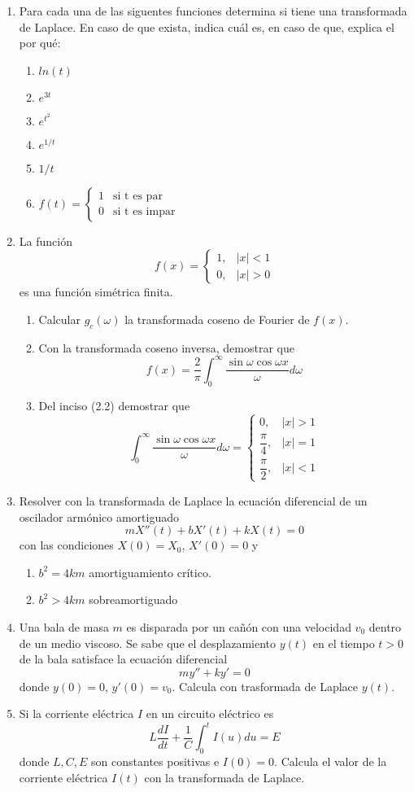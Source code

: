 \begin{enumerate}
\item Para cada una de las siguentes funciones determina si tiene una transformada de Laplace. En caso de que exista, indica cuál es, en caso de que, explica el por qué:
\begin{enumerate}
\item $ln(t)$
\item $e^{3t}$
\item $e^{t^{2}}$
\item $e^{1/t}$
\item $1/t$
\item $f(t) = \begin{cases} 1 & \mbox{si t es par} \\ 0 & \mbox{si t es impar} \end{cases}$
\end{enumerate}
\item La función
\[ f(x) = \begin{cases}
1, & \vert x \vert < 1 \\
0, & \vert x \vert > 0
\end{cases} \]
es una función simétrica finita.
\begin{enumerate}
\item Calcular $g_{c}(\omega)$ la transformada coseno de Fourier de $f(x)$.
\item\label{itm:inciso2} Con la transformada coseno inversa, demostrar que
\[ f(x) = \dfrac{2}{\pi} \int_{0}^{\infty} \dfrac{\sin \omega \cos \omega x}{\omega} d \omega \] 
\item Del inciso (2.2) demostrar que
\[ \int_{0}^{\infty} \dfrac{\sin \omega \cos \omega x}{\omega} d \omega = 
\begin{cases}
0, & \vert x \vert > 1 \\
\dfrac{\pi}{4}, & \vert x \vert = 1 \\
\dfrac{\pi}{2}, & \vert x \vert < 1
\end{cases} \]
\end{enumerate}
\item Resolver con la transformada de Laplace la ecuación diferencial de un oscilador armónico amortiguado
\[ m X''(t) + b X'(t) + k X(t) = 0 \]
con las condiciones $X(0) = X_{0}$, $X'(0) = 0$ y
\begin{enumerate}
\item $b^{2} = 4 km$ amortiguamiento crítico.
\item $b^{2} > 4 km$ sobreamortiguado
\end{enumerate}
\item Una bala de masa $m$ es disparada por un cañón con una velocidad $v_{0}$ dentro de un medio viscoso. Se sabe que el desplazamiento $y(t)$ en el tiempo $t > 0$ de la bala satisface la ecuación diferencial
\[ m y'' + k y' = 0 \]
donde $y(0)= 0$, $y'(0) =  v_{0}$. Calcula con trasformada de Laplace $y(t)$.
\item Si la corriente eléctrica $I$ en un circuito eléctrico es
\[ L \dfrac{dI}{dt} +  \dfrac{1}{C} \int_{0}^{t} I(u) du =  E \]
donde $L,C,E$ son constantes positivas e $I(0)=0$. Calcula el valor de la corriente eléctrica $I(t)$ con la transformada de Laplace.
\]
\end{enumerate}
